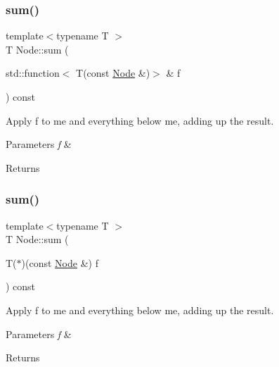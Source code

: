 \subsubsection{\texorpdfstring{sum()}{sum()}\hspace{0.1cm}{\footnotesize\ttfamily [1/2]}}
{\footnotesize\ttfamily template$<$typename T $>$ \\
T Node\+::sum (\begin{DoxyParamCaption}\item[{std\+::function$<$ T(const \hyperlink{class_node}{Node} \&)$>$ \&}]{f }\end{DoxyParamCaption}) const\hspace{0.3cm}{\ttfamily [inline]}}

Apply f to me and everything below me, adding up the result. 
\begin{DoxyParams}{Parameters}
{\em f} & \\
\hline
\end{DoxyParams}
\begin{DoxyReturn}{Returns}

\end{DoxyReturn}
\mbox{\label{class_node_a089e99addd93f91b2ef5a9d0c3e6bdeb}} 
\subsubsection{\texorpdfstring{sum()}{sum()}\hspace{0.1cm}{\footnotesize\ttfamily [2/2]}}
{\footnotesize\ttfamily template$<$typename T $>$ \\
T Node\+::sum (\begin{DoxyParamCaption}\item[{T($\ast$)(const \hyperlink{class_node}{Node} \&)}]{f }\end{DoxyParamCaption}) const\hspace{0.3cm}{\ttfamily [inline]}}

Apply f to me and everything below me, adding up the result. 
\begin{DoxyParams}{Parameters}
{\em f} & \\
\hline
\end{DoxyParams}
\begin{DoxyReturn}{Returns}

\end{DoxyReturn}
\mbox{\label{class_node_aa727c354e38f60fb1560d72ae1aaa9af}} 
